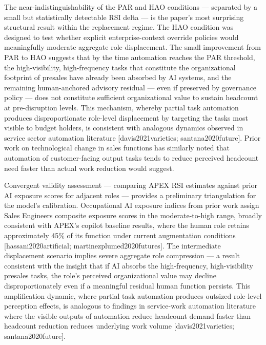 \documentclass[10pt, conference]{IEEEtran}
\begin{document}
The near-indistinguishability of the PAR and HAO conditions --- separated by a small but statistically detectable RSI delta --- is the paper's most surprising structural result within the replacement regime. The HAO condition was designed to test whether explicit enterprise-context override policies would meaningfully moderate aggregate role displacement. The small improvement from PAR to HAO suggests that by the time automation reaches the PAR threshold, the high-visibility, high-frequency tasks that constitute the organizational footprint of presales have already been absorbed by AI systems, and the remaining human-anchored advisory residual --- even if preserved by governance policy --- does not constitute sufficient organizational value to sustain headcount at pre-disruption levels. This mechanism, whereby partial task automation produces disproportionate role-level displacement by targeting the tasks most visible to budget holders, is consistent with analogous dynamics observed in service sector automation literature [davis2021varieties; santana2020future]. Prior work on technological change in sales functions \cite{groene2024introduction} has similarly noted that automation of customer-facing output tasks tends to reduce perceived headcount need faster than actual work reduction would suggest.

Convergent validity assessment --- comparing APEX RSI estimates against prior AI exposure scores for adjacent roles --- provides a preliminary triangulation for the model's calibration. Occupational AI exposure indices from prior work assign Sales Engineers composite exposure scores in the moderate-to-high range, broadly consistent with APEX's copilot baseline results, where the human role retains approximately 45\% of its function under current augmentation conditions [hassani2020artificial; martinezplumed2020futures]. The intermediate displacement scenario implies severe aggregate role compression --- a result consistent with the insight that if AI absorbs the high-frequency, high-visibility presales tasks, the role's perceived organizational value may decline disproportionately even if a meaningful residual human function persists. This amplification dynamic, where partial task automation produces outsized role-level perception effects, is analogous to findings in service-work automation literature where the visible outputs of automation reduce headcount demand faster than headcount reduction reduces underlying work volume [davis2021varieties; santana2020future].
\end{document}
